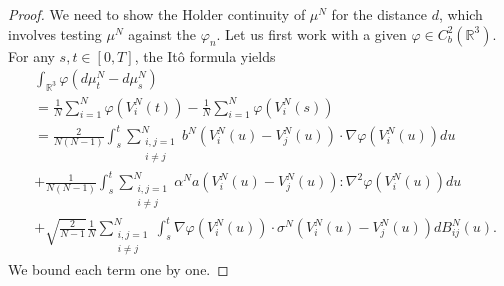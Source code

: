 \documentclass[11pt,a4paper]{article}
\theoremstyle{definition}
\theoremstyle{plain}
\begin{document}
\begin{proof}
We need to show the Holder continuity of $\mu^N$ for the distance $d$, which involves testing $\mu^N$ against the $\varphi_n$. Let us first work with a given $\varphi \in C^2_b(\mathbb{R}^3)$. For any $s,t\in[0,T]$, the Itô formula yields
\begin{align}
        &\int_{\mathbb{R}^3} \varphi (d\mu^N_t-d\mu^N_s)\nonumber\\
        &=
       \frac{1}{N}\sum_{i=1}^N\varphi(V^N_i(t))-\frac{1}{N}\sum_{i=1}^N\varphi(V^N_i(s))\nonumber \\
       \label{eq:Itôempiricalmeasures6}
       &= \frac{2}{N(N-1)}\int_s^t \sum_{\substack{i,j=1\\ i\neq j}}^N  b^N\left(V^N_i(u) -V^N_j(u)\right) \cdot \nabla\varphi\left(V^N_i(u)\right) du\ \\
       \label{eq:Itôempiricalmeasures7}
       &+ \frac{1}{N(N-1)} \int_s^t \sum_{\substack{i,j=1\\ i\neq j}}^N  \alpha^Na\left(V^N_i(u) -V^N_j(u)\right):\nabla^2\varphi\left(V^N_i(u)\right)du\\
       \label{eq:Itôempiricalmeasures8}
       &+\sqrt{\frac{2}{N-1}}\frac{1}{N}\sum_{\substack{i,j=1\\ i\neq j}}^N \int_s^t  \nabla \varphi\left(V^N_i(u)\right)\cdot \sigma^N \left(V^N_i(u) - V^N_j(u)\right)dB^N_{ij}(u).
    \end{align}
We bound each term one by one.


\end{proof}
\end{document}

